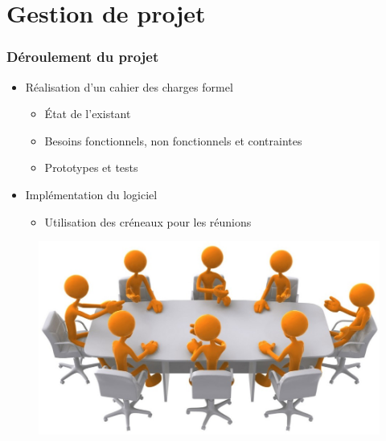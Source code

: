 \documentclass{beamer}
\begin{document}
\section{Gestion de projet}

\begin{frame}
\frametitle{Déroulement du projet}
\begin{itemize}[label=$\bullet$]
\item Réalisation d'un cahier des charges formel
	\begin{itemize}[label=$\circ$]
	\item État de l'existant
	\item Besoins fonctionnels, non fonctionnels et contraintes
	\item Prototypes et tests
	\end{itemize}
\item Implémentation du logiciel
	\begin{itemize}[label=$\circ$]
	\item Utilisation des créneaux pour les réunions
	\end{itemize}
\end{itemize}

\begin{figure}[B]
\includegraphics[scale=0.2]{clipart-meeting.png}
\end{figure}

\end{frame}

\end{document}
